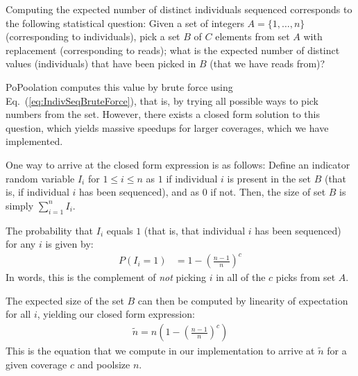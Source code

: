 \documentclass[a4paper,fontsize=9pt,DIV=14]{scrartcl}
\newcounter{popoolissue}
\newcommand\popoolissue[1]{}
\newcommand\eqnref[1]{Eq.~(\ref{#1})}
\newcommand{\coverage}{c}
\begin{document}
\popoolissue{Furthermore, the original equations document states that ``$\tilde{n}$ is obtained averaging $\tilde{n}$ over the window W'', which we also stated above. However, looking at the code \href{https://github.com/lczech/popoolation/blob/092e7a6f7ee4910c1bec4377e0adccc353175bc8/Modules/VarMath.pm\#L127}{here}, there is no averaging over the window, and instead it's just computed once. The function for averaging exists in the same PoPoolation function as well, see \href{https://github.com/lczech/popoolation/blob/092e7a6f7ee4910c1bec4377e0adccc353175bc8/Modules/VarMath.pm\#L117-L125}{here}, but is commented out, and also contains a bug, as \texttt{\$cov} is not used. We are unsure how much averaging over the window vs just one value actually changes the results, and hence wanted to bring it up here.} 

Computing the expected number of distinct individuals sequenced corresponds to the following statistical question:
Given a set of integers $A = \{1, \ldots, n\}$ (corresponding to individuals),
pick a set $B$ of $C$ elements from set $A$ with replacement (corresponding to reads);
what is the expected number of distinct values (individuals) that have been picked in $B$ (that we have reads from)?

PoPoolation computes this value by brute force using \eqnref{eq:IndivSeqBruteForce},
that is, by trying all possible ways to pick numbers from the set.
However, there exists a closed form solution to this question, which yields massive speedups for larger coverages, which we have implemented.

One way to arrive at the closed form expression is as follows:
Define an indicator random variable $I_i$ for $1 \leq i \leq n$ as $1$
if individual $i$ is present in the set $B$ (that is, if individual $i$ has been sequenced), and as $0$ if not.
Then, the size of set $B$ is simply $\sum_{i=1}^{n} I_i$.

The probability that $I_i$ equals $1$ (that is, that individual $i$ has been sequenced)
for any $i$ is given by:
%
\begin{align}
    P(I_i = 1) &= 1-\left( \frac{n-1}{n} \right)^\coverage
\end{align}
%
In words, this is the complement of \emph{not} picking $i$ in all of the $\coverage$ picks from set $A$.

The expected size of the set $B$ can then be computed by linearity of expectation for all $i$,
yielding our closed form expression:
%
%
\begin{align}
    \tilde{n} = n \left( 1 - \left( \frac{n-1}{n} \right)^\coverage \right)
\end{align}
%
This is the equation that we compute in our implementation to arrive at $\tilde{n}$ for a given coverage $\coverage$ and poolsize $n$.
\end{document}
